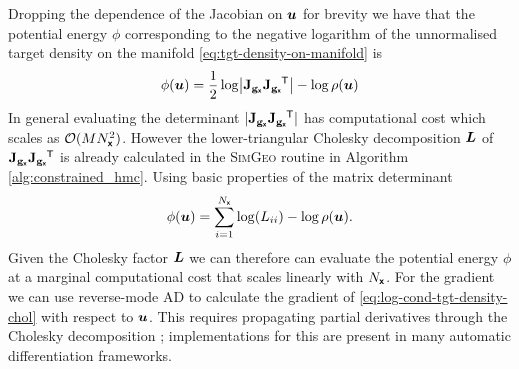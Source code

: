Dropping the dependence of the Jacobian on $\boldsymbol{u}$ for brevity we have that the potential energy $\phi$ corresponding to the negative logarithm of the unnormalised target density on the manifold \eqref{eq:tgt-density-on-manifold} is
\begin{equation} \label{eq:log-cond-tgt-density}
    \phi(\vct{u}) =  
    \frac{1}{2} \log\left| 
      \jacobian{\genfunc_{\rvct{x}}}\jacobian{\genfunc_{\rvct{x}}}\phantom{}\tr
    \right| - \log\rho(\vct{u})
\end{equation}
In general evaluating the determinant $|\mathbf{J}_{{\mathbf{g}}_{\boldsymbol{\mathsf{x}}}}\mathbf{J}_{{\mathbf{g}}_{\boldsymbol{\mathsf{x}}}}\phantom{}^{\mkern-1.5mu\mathsf{T}}|$ has computational cost which scales as $\mathcal{O}(M N_{\boldsymbol{\mathsf{x}}}^2)$. However the lower-triangular Cholesky decomposition $\boldsymbol{L}$ of $\mathbf{J}_{{\mathbf{g}}_{\boldsymbol{\mathsf{x}}}}\mathbf{J}_{{\mathbf{g}}_{\boldsymbol{\mathsf{x}}}}\phantom{}^{\mkern-1.5mu\mathsf{T}}$ is already calculated in the \textsc{SimGeo} routine in Algorithm \ref{alg:constrained_hmc}. Using basic properties of the matrix determinant
\begin{equation}\label{eq:log-cond-tgt-density-chol}
    \phi(\boldsymbol{u}) = 
    \sum_{i=1}^{N_{\boldsymbol{\mathsf{x}}}}\log(L_{ii}) - \log\rho(\boldsymbol{u}).
\end{equation}
Given the Cholesky factor $\boldsymbol{L}$ we can therefore can evaluate the potential energy $\phi$ at a marginal computational cost that scales linearly with $N_{\boldsymbol{\mathsf{x}}}$. For the gradient we can use reverse-mode \ac{AD} to calculate the gradient of \eqref{eq:log-cond-tgt-density-chol} with respect to $\boldsymbol{u}$. This requires propagating partial derivatives through the Cholesky decomposition \citep{murray2016differentiation}; implementations for this are present in many automatic differentiation frameworks.

